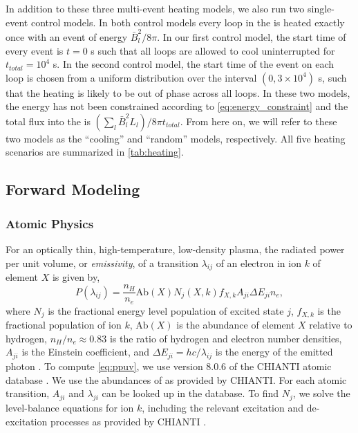 In addition to these three multi-event heating models, we also run two single-event control models. In both control models every loop in the \AR{} is heated exactly once with an event of energy $\bar{B}_l^2/8\pi$. In our first control model, the start time of every event is $t=0$ s such that all loops are allowed to cool uninterrupted for $t_{total}=10^4$ s. In the second control model, the start time of the event on each loop is chosen from a uniform distribution over the interval $(0, 3\times10^4)$ s, such that the heating is likely to be out of phase across all loops. In these two models, the energy has not been constrained according to \autoref{eq:energy_constraint} and the total flux into the \AR{} is $(\sum_{l}\bar{B}_l^2L_l)/8\pi t_{total}$. From here on, we will refer to these two models as the ``cooling'' and ``random'' models, respectively. All five heating scenarios are summarized in \autoref{tab:heating}.

\subsection{Forward Modeling}\label{forward}

\subsubsection{Atomic Physics}\label{atomic}

For an optically thin, high-temperature, low-density plasma, the radiated power per unit volume, or \textit{emissivity}, of a transition $\lambda_{ij}$ of an electron in ion $k$ of element $X$ is given by,
\begin{equation}
    \label{eq:ppuv}
    P(\lambda_{ij}) = \frac{n_H}{n_e}\mathrm{Ab}(X)N_j(X,k)f_{X,k}A_{ji}\Delta E_{ji}n_e,
\end{equation}
where $N_j$ is the fractional energy level population of excited state $j$, $f_{X,k}$ is the fractional population of ion $k$, $\mathrm{Ab}(X)$ is the abundance of element $X$ relative to hydrogen, $n_H/n_e\approx0.83$ is the ratio of hydrogen and electron number densities, $A_{ji}$ is the Einstein coefficient, and $\Delta E_{ji}=hc/\lambda_{ij}$ is the energy of the emitted photon \citep[see][]{mason_spectroscopic_1994,del_zanna_solar_2018}. To compute \autoref{eq:ppuv}, we use version 8.0.6 of the CHIANTI atomic database \citep{dere_chianti_1997,young_chianti_2016}. We use the abundances of \citet{feldman_potential_1992} as provided by CHIANTI. For each atomic transition, $A_{ji}$ and $\lambda_{ji}$ can be looked up in the database. To find $N_j$, we solve the level-balance equations for ion $k$, including the relevant excitation and de-excitation processes as provided by CHIANTI \citep[see section 3.3 of][]{del_zanna_solar_2018}.

